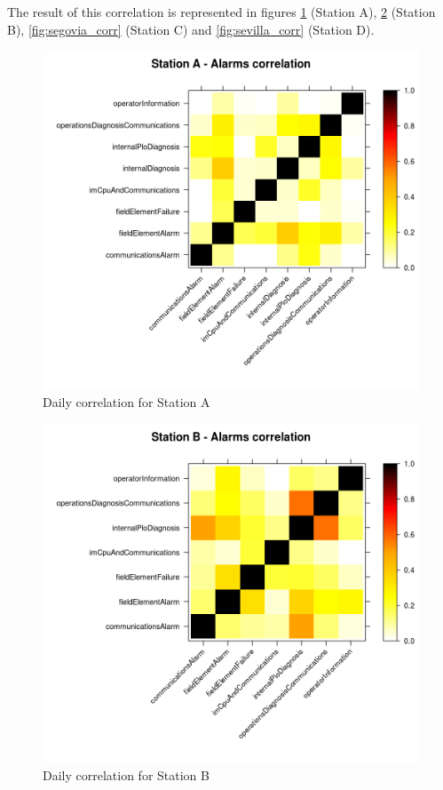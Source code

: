 The result of this correlation is represented in figures \ref{fig:albacete_corr} (Station A), \ref{fig:anteq_corr} (Station B), \ref{fig:segovia_corr} (Station C) and \ref{fig:sevilla_corr} (Station D).

\begin{figure}[htb]
 \centering
 \includegraphics[width=\textwidth]{./img/albacete_corr.png}
 \caption{Daily correlation for Station A} \label{fig:albacete_corr}
\end{figure}
\begin{figure}[htb]
 \centering
 \includegraphics[width=\textwidth]{./img/antequera_corr.png}
 \caption{Daily correlation for Station B} \label{fig:anteq_corr}
\end{figure}

